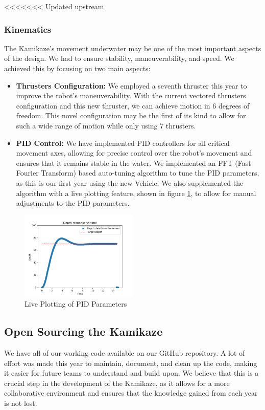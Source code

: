<<<<<<< Updated upstream
\subsubsection{Kinematics}
The Kamikaze's movement underwater may be one of the most important aspects of
the design. We had to ensure stability, maneuverability, and speed. We achieved
this by focusing on two main aspects:
\begin{itemize}
        
    \item \textbf{Thrusters Configuration:} We employed a seventh thruster this year to
        improve the robot's maneuverability. With the current vectored thrusters
        configuration and this new thruster, we can achieve motion in 6 degrees of freedom.
        This novel configuration may be the first of its kind to allow for such a wide range of motion while only using 7 thrusters.

        \item \textbf{PID Control:} We have implemented PID controllers for all critical movement axes, allowing for
        precise control over the robot's movement and ensures that it remains stable in the water. We implemented an FFT (Fast Fourier Transform)
        based auto-tuning algorithm to tune the PID parameters, as this is our first year using the new Vehicle. We also supplemented the algorithm with a live
        plotting feature, shown in figure \ref{fig:pid_live},
         to allow for manual adjustments to the PID parameters.
\end{itemize}
\begin{figure}[h]
    \centering
    \includegraphics[width=0.5\textwidth]{Sections/3Design&Manufacturing/tex/Software/images/Pid.png}
    \caption{Live Plotting of PID Parameters}
    \label{fig:pid_live}
\end{figure}

\subsection{Open Sourcing the Kamikaze}
We have all of our working code available on our GitHub repository. A lot of effort
was made this year to maintain, document, and clean up the code, making it easier
for future teams to understand and build upon. We believe that this is a crucial
step in the development of the Kamikaze, as it allows for a more collaborative
environment and ensures that the knowledge gained from each year is not lost. 

